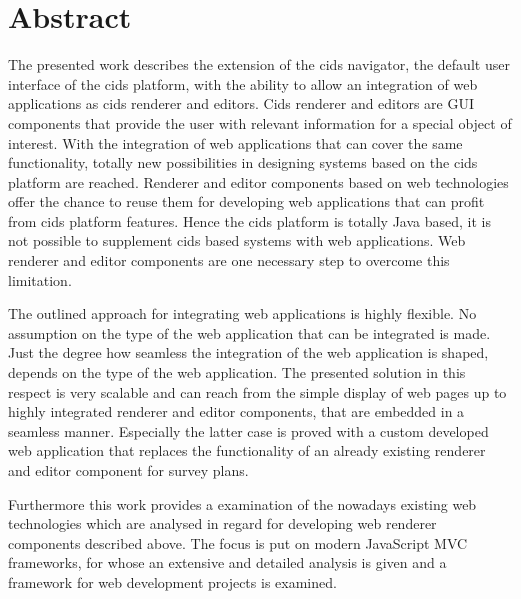 \chapter*{Abstract}

The presented work describes the extension of the cids navigator, the default user interface of the cids platform, with the ability to allow an integration of web applications as cids renderer and editors. 
Cids renderer and editors are GUI components that provide the user with relevant information for a special object of interest. 
With the integration of web applications that can cover the same functionality, totally new possibilities in designing systems based on the cids platform are reached. 
Renderer and editor components based on web technologies offer the chance to reuse them for developing web applications that can profit from cids platform features. 
Hence the cids platform is totally Java based, it is not possible to supplement cids based systems with web applications. 
Web renderer and editor components are one necessary step to overcome this limitation.

The outlined approach for integrating web applications is highly flexible. 
No assumption on the type of the web application that can be integrated is made. 
Just the degree how seamless the integration of the web application is shaped, depends on the type of the web application. 
The presented solution in this respect is very scalable and can reach from the simple display of web pages up to highly integrated renderer and editor components, that are embedded in a seamless manner. 
Especially the latter case is proved with a custom developed web application that replaces the functionality of an already existing renderer and editor component for survey plans. 

Furthermore this work provides a examination of the nowadays existing web technologies which are analysed in regard for developing web renderer components described above. The focus is put on modern JavaScript MVC frameworks, for whose an extensive and detailed analysis is given and a framework for web development projects is examined.

